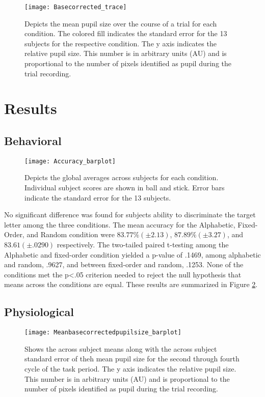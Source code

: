 \documentclass[10pt]{article}
\begin{document}
\begin{figure}[t]
  \centering
  \texttt{[image: Basecorrected\_trace]}
  \caption{Depicts the mean pupil size over the course of a trial
  for each condition.  The colored fill indicates the standard error
  for the 13 subjects for the respective condition.  The y axis indicates the
  relative pupil size.  This number is in arbitrary units (AU) and
  is proportional to the number of pixels identified as pupil during
  the trial recording.}
  \label{trialtrace}
\end{figure}

\section{Results}

\subsection{Behavioral}

\begin{figure}[t]
  \centering
  \texttt{[image: Accuracy\_barplot]}
  \caption{Depicts the global averages across subjects for each
  condition.  Individual subject scores are shown in ball and stick.  Error bars
  indicate the standard error for the 13 subjects.}
  \label{accuracy}
\end{figure}

No significant difference was found for subjects ability to
discriminate the target letter among the three conditions.
The mean accuracy for the Alphabetic, Fixed-Order, and Random
condition were $83.77 \% (\pm2.13)$, $87.89 \% (\pm3.27)$,
and $83.61 (\pm .0290)$ respectively.  The two-tailed paired t-testing among 
the Alphabetic and fixed-order condition yielded a p-value of .1469,
among alphabetic and random, .9627, and between fixed-order and
random, .1253.  None of the conditions met the p<.05 criterion needed
to reject the null hypothesis that means across the conditions are
equal. These results are summarized in Figure \ref{accuracy}.

\subsection{Physiological}
\begin{figure}[t]
  \centering
  \texttt{[image: Meanbasecorrectedpupilsize\_barplot]}
  \caption{Shows the across subject means along with the across
  subject standard error of theh mean pupil size for the second
  through fourth cycle of the task period. The y axis indicates the
  relative pupil size.  This number is in arbitrary units (AU) and
  is proportional to the number of pixels identified as pupil during
  the trial recording.}
  \label{psBarplot}
\end{figure}
\end{document}
